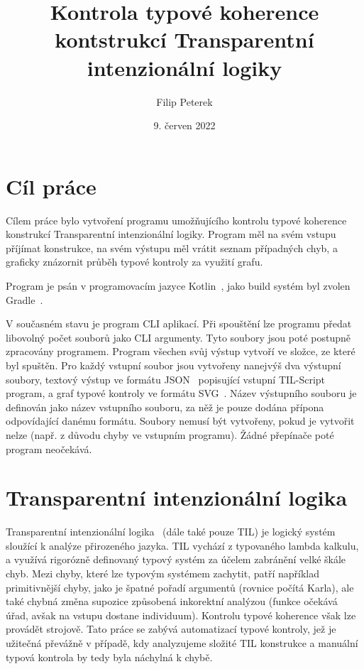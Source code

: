 \documentclass{article}
\title{Kontrola typové koherence kontstrukcí Transparentní intenzionální logiky}
\author{Filip Peterek}
\date{9. červen 2022}
\begin{document}
\maketitle

\section{Cíl práce}

Cílem práce bylo vytvoření programu umožňujícího kontrolu typové koherence konstrukcí Transparentní
intenzionální logiky. Program měl na svém vstupu příjímat konstrukce, na svém výstupu měl
vrátit seznam případných chyb, a graficky znázornit průběh typové kontroly za využití grafu.

Program je psán v programovacím jazyce Kotlin~\cite{kotlin-src}, jako build systém byl zvolen
Gradle~\cite{gradle-src}.

V současném stavu je program CLI aplikací. Při spouštění lze programu předat libovolný počet souborů
jako CLI argumenty. Tyto soubory jsou poté postupně zpracovány programem. Program všechen svůj
výstup vytvoří ve složce, ze které byl spuštěn. Pro každý vstupní soubor jsou vytvořeny nanejvýš
dva výstupní soubory, textový výstup ve formátu JSON~\cite{json-src} popisující vstupní TIL-Script program, a graf
typové kontroly ve formátu SVG~\cite{svg-src}. Název výstupního souboru je definován jako název
vstupního souboru, za něž je pouze dodána přípona odpovídající danému formátu. Soubory nemusí být
vytvořeny, pokud je vytvořit nelze (např. z důvodu chyby ve vstupním programu). Žádné přepínače
poté program neočekává.

\section{Transparentní intenzionální logika}

Transparentní intenzionální logika~\cite{til-duzi} (dále také pouze TIL) je logický systém sloužící
k analýze přirozeného jazyka. TIL vychází z typovaného lambda kalkulu, a využívá rigorózně definovaný
typový systém za účelem zabránění velké škále chyb. Mezi chyby, které lze typovým systémem zachytit,
patří například primitivnější chyby, jako je špatné pořadí argumentů (rovnice počítá Karla), ale také
chybná změna supozice způsobená inkorektní analýzou (funkce očekává úřad, avšak na vstupu dostane
individuum). Kontrolu typové koherence však lze provádět strojově. Tato práce se zabývá automatizací
typové kontroly, jež je užitečná převážně v případě, kdy analyzujeme složité TIL konstrukce a manuální
typová kontrola by tedy byla náchylná k chybě.
\end{document}
